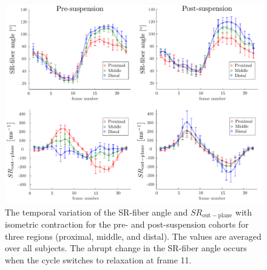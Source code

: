 \begin{figure}[!htb]
\vspace{+0.2cm}
\centering
\includegraphics[width=\textwidth]{Figures/ULLS_fiberAngle.pdf}
\caption[The temporal variation of the SR-fiber angle and $SR_\mathrm{out-plane}$ with isometric contraction for the pre- and post-suspension cohort]{The temporal variation of the SR-fiber angle and $SR_\mathrm{out-plane}$ with isometric contraction for the pre- and post-suspension cohorts for three regions (proximal, middle, and distal). The values are averaged over all subjects. The abrupt change in the SR-fiber angle occurs when the cycle switches to relaxation at frame 11.}
\label{fig: SR1_3}
\end{figure}
